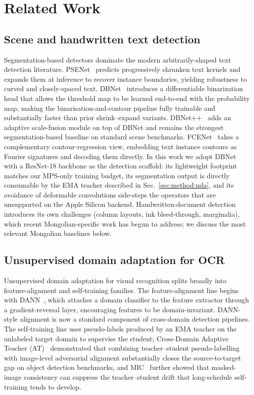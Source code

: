 \section{Related Work}
\label{sec:related}

\subsection{Scene and handwritten text detection}
Segmentation-based detectors dominate the modern arbitrarily-shaped
text detection literature. PSENet~\cite{wang2019pse} predicts
progressively shrunken text kernels and expands them at inference to
recover instance boundaries, yielding robustness to curved and
closely-spaced text. DBNet~\cite{liao2020real} introduces a
differentiable binarization head that allows the threshold map to be
learned end-to-end with the probability map, making the
binarisation-and-contour pipeline fully trainable and substantially
faster than prior shrink--expand variants. DBNet++~\cite{liao2022dbpp}
adds an adaptive scale-fusion module on top of DBNet and remains the
strongest segmentation-based baseline on standard scene benchmarks.
FCENet~\cite{zhu2021fcenet} takes a complementary contour-regression
view, embedding text instance contours as Fourier signatures and
decoding them directly. In this work we adopt DBNet with a ResNet-18
backbone as the detection scaffold: its lightweight footprint matches
our MPS-only training budget, its segmentation output is directly
consumable by the EMA teacher described in
Sec.~\ref{sec:method:uda}, and its avoidance of deformable
convolutions side-steps the operators that are unsupported on the
Apple Silicon backend. Handwritten-document detection introduces its
own challenges (column layouts, ink bleed-through, marginalia), which
recent Mongolian-specific work has begun to address; we discuss the
most relevant Mongolian baselines below.

\subsection{Unsupervised domain adaptation for OCR}
Unsupervised domain adaptation for visual recognition splits broadly
into feature-alignment and self-training families. The
feature-alignment line begins with DANN~\cite{ganin2015dann}, which
attaches a domain classifier to the feature extractor through a
gradient-reversal layer, encouraging features to be domain-invariant.
DANN-style alignment is now a standard component of cross-domain
detection pipelines. The self-training line uses pseudo-labels
produced by an EMA teacher on the unlabeled target domain to
supervise the student; Cross-Domain Adaptive Teacher
(AT)~\cite{li2022adapttch} demonstrated that combining
teacher--student pseudo-labelling with image-level adversarial
alignment substantially closes the source-to-target gap on object
detection benchmarks, and MIC~\cite{hoyer2023mic} further showed that
masked-image consistency can suppress the teacher--student drift that
long-schedule self-training tends to develop.

